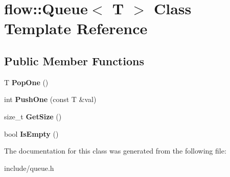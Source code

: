 \hypertarget{classflow_1_1_queue}{}\section{flow\+:\+:Queue$<$ T $>$ Class Template Reference}
\label{classflow_1_1_queue}
\subsection*{Public Member Functions}
\begin{DoxyCompactItemize}
\item 
T {\bfseries Pop\+One} ()\hypertarget{classflow_1_1_queue_a28120925dcc766b3ab43e65a4a531cdd}{}\label{classflow_1_1_queue_a28120925dcc766b3ab43e65a4a531cdd}

\item 
int {\bfseries Push\+One} (const T \&val)\hypertarget{classflow_1_1_queue_a9ab3e711679fc954a9971263edb2094f}{}\label{classflow_1_1_queue_a9ab3e711679fc954a9971263edb2094f}

\item 
size\+\_\+t {\bfseries Get\+Size} ()\hypertarget{classflow_1_1_queue_a2ba03f10b0e720fa57f4caa2659efa5f}{}\label{classflow_1_1_queue_a2ba03f10b0e720fa57f4caa2659efa5f}

\item 
bool {\bfseries Is\+Empty} ()\hypertarget{classflow_1_1_queue_a230ae11b63c3d289679e0f9ca5317bd5}{}\label{classflow_1_1_queue_a230ae11b63c3d289679e0f9ca5317bd5}

\end{DoxyCompactItemize}


The documentation for this class was generated from the following file\+:\begin{DoxyCompactItemize}
\item 
include/queue.\+h\end{DoxyCompactItemize}
